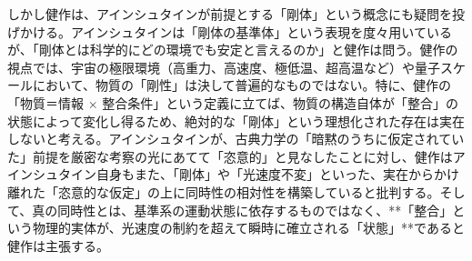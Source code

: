 \documentclass{article}
\begin{document}
しかし健作は、アインシュタインが前提とする「剛体」という概念にも疑問を投げかける。アインシュタインは「剛体の基準体」という表現を度々用いているが、「剛体とは科学的にどの環境でも安定と言えるのか」と健作は問う。健作の視点では、宇宙の極限環境（高重力、高速度、極低温、超高温など）や量子スケールにおいて、物質の「剛性」は決して普遍的なものではない。特に、健作の「物質＝情報 × 整合条件」という定義に立てば、物質の構造自体が「整合」の状態によって変化し得るため、絶対的な「剛体」という理想化された存在は実在しないと考える。アインシュタインが、古典力学の「暗黙のうちに仮定されていた」前提を厳密な考察の光にあてて「恣意的」と見なしたことに対し、健作はアインシュタイン自身もまた、「剛体」や「光速度不変」といった、実在からかけ離れた「恣意的な仮定」の上に同時性の相対性を構築していると批判する。そして、真の同時性とは、基準系の運動状態に依存するものではなく、**「整合」という物理的実体が、光速度の制約を超えて瞬時に確立される「状態」**であると健作は主張する。
\end{document}
